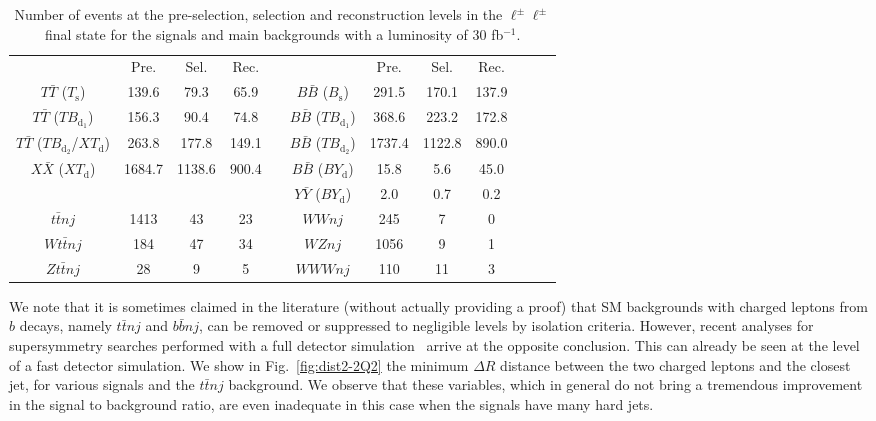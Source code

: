 \documentclass[12pt,a4paper]{article}
\newcommand{\TT}{T \bar T}
\newcommand{\BB}{B \bar B}
\newcommand{\XX}{X \bar X}
\newcommand{\YY}{Y \bar Y}
\newcommand{\Ts}{T_\text{s}}
\newcommand{\Bs}{B_\text{s}}
\newcommand{\TBd}{TB_{\text{d}_1}}
\newcommand{\TBD}{TB_{\text{d}_2}}
\newcommand{\XTd}{XT_\text{d}}
\newcommand{\BYd}{BY_\text{d}}
\begin{document}
\begin{table}[htb]
\begin{center}
\begin{tabular}{cccccccccccc}
               & Pre.   & Sel.   & Rec.  & \quad &          & Pre.  & Sel.  & Rec. \\[1mm]
$\TT$ ($\Ts$)  & 139.6  & 79.3   & 65.9  & & $\BB$ ($\Bs$)  & 291.5 & 170.1 & 137.9 \\
$\TT$ ($\TBd$) & 156.3  & 90.4   & 74.8  & & $\BB$ ($\TBd$) & 368.6 & 223.2 & 172.8 \\
$\TT$ ($\TBD$/$\XTd$) & 263.8  & 177.8  & 149.1 & & $\BB$ ($\TBD$) & 1737.4 & 1122.8 & 890.0 \\
$\XX$ ($\XTd$) & 1684.7 & 1138.6 & 900.4 & & $\BB$ ($\BYd$) & 15.8  & 5.6   & 45.0 \\
               &        &        &       & & $\YY$ ($\BYd$) & 2.0   & 0.7   & 0.2 \\
\hline
$t \bar t nj$  & 1413   & 43     & 23    & & $WWnj$         & 245   & 7     & 0  \\
$W t \bar tnj$ & 184    & 47     & 34    & & $WZnj$         & 1056  & 9     & 1  \\
$Z t \bar tnj$ & 28     & 9      & 5     & & $WWWnj$        & 110   & 11    & 3 \\
\end{tabular}
\end{center}
\caption{Number of events at the pre-selection, selection and reconstruction levels in the $\ell^\pm \ell^\pm$ final state for the signals and main backgrounds with a luminosity of 30 fb$^{-1}$.}
\label{tab:nsnb-2Q2}
\end{table}
%
We note that it is sometimes claimed in the literature (without actually providing a proof) that SM backgrounds with charged leptons from $b$ decays, namely $t \bar t nj$ and $b \bar b nj$, can be removed or suppressed to negligible levels by isolation criteria.
However, recent analyses for supersymmetry searches performed with a full detector simulation~\cite{Aad:2009wy} arrive at the opposite conclusion. This can already be seen at the level of a fast detector simulation.
We show in Fig.~\ref{fig:dist2-2Q2} the minimum $\Delta R$ distance between the two charged leptons and the closest jet, for various signals and the $t \bar t nj$ background. We observe that these variables, which in general do not bring a tremendous improvement in the signal to background ratio, are even inadequate in this case when the signals have many hard jets.
\end{document}
